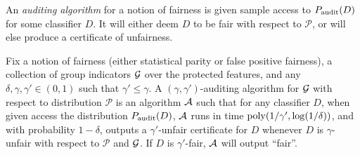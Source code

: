 An \emph{auditing algorithm} for a notion of fairness is given sample access to $P_\mathrm{audit}(D)$ for some classifier $D$. It will either deem $D$ to be fair with respect to $\mathcal{P}$, or will else produce a certificate of unfairness.



\begin{definition}
  Fix a notion of fairness (either statistical parity or false
  positive fairness), a collection of group indicators $\mathcal{G}$ over the
  protected features, and any $\delta, \gamma, \gamma' \in (0, 1)$
  such that $\gamma'\leq \gamma$.  A {$(\gamma, \gamma')$-auditing
    algorithm for $\mathcal{G}$ with respect to distribution $\mathcal{P}$} is
  an algorithm $\mathcal{A}$ such that for any classifier $D$, when given
  access the distribution $P_\mathrm{audit}(D)$, $\mathcal{A}$ runs in time
  $\operatorname{poly}(1/\gamma', \log(1/\delta))$, and with probability $1-\delta$,
  outputs a $\gamma'$-unfair certificate for $D$ whenever $D$ is
  $\gamma$-unfair with respect to $\mathcal{P}$ and $\mathcal{G}$. If $D$ is
  $\gamma'$-fair, $\mathcal{A}$ will output ``fair''.
\end{definition}

